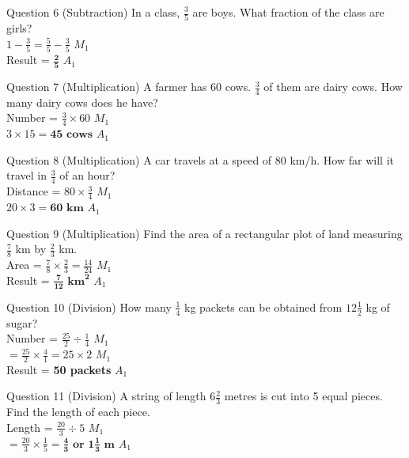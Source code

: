\documentclass[12pt, a4paper, oneside]{article}
\begin{document}
\begin{solvingbox}{Question 6 (Subtraction)}
In a class, $\frac{3}{5}$ are boys. What fraction of the class are girls? \\
$1 - \frac{3}{5} = \frac{5}{5} - \frac{3}{5}$ \hfill $M_1$ \\
Result = $\mathbf{\frac{2}{5}}$ \hfill $A_1$
\end{solvingbox}

\begin{solvingbox}{Question 7 (Multiplication)}
A farmer has 60 cows. $\frac{3}{4}$ of them are dairy cows. How many dairy cows does he have? \\
Number = $\frac{3}{4} \times 60$ \hfill $M_1$ \\
$3 \times 15 = \mathbf{45\text{ cows}}$ \hfill $A_1$
\end{solvingbox}

\begin{solvingbox}{Question 8 (Multiplication)}
A car travels at a speed of 80 km/h. How far will it travel in $\frac{3}{4}$ of an hour? \\
Distance = $80 \times \frac{3}{4}$ \hfill $M_1$ \\
$20 \times 3 = \mathbf{60\text{ km}}$ \hfill $A_1$
\end{solvingbox}

\begin{solvingbox}{Question 9 (Multiplication)}
Find the area of a rectangular plot of land measuring $\frac{7}{8}$ km by $\frac{2}{3}$ km. \\
Area = $\frac{7}{8} \times \frac{2}{3} = \frac{14}{24}$ \hfill $M_1$ \\
Result = $\mathbf{\frac{7}{12}\text{ km}^2}$ \hfill $A_1$
\end{solvingbox}

\begin{solvingbox}{Question 10 (Division)}
How many $\frac{1}{4}$ kg packets can be obtained from $12\frac{1}{2}$ kg of sugar? \\
Number = $\frac{25}{2} \div \frac{1}{4}$ \hfill $M_1$ \\
$= \frac{25}{2} \times \frac{4}{1} = 25 \times 2$ \hfill $M_1$ \\
Result = \textbf{50 packets} \hfill $A_1$
\end{solvingbox}

\begin{solvingbox}{Question 11 (Division)}
A string of length $6\frac{2}{3}$ metres is cut into 5 equal pieces. Find the length of each piece. \\
Length = $\frac{20}{3} \div 5$ \hfill $M_1$ \\
$= \frac{20}{3} \times \frac{1}{5} = \mathbf{\frac{4}{3}\text{ or } 1\frac{1}{3}\text{ m}}$ \hfill $A_1$
\end{solvingbox}
\end{document}
